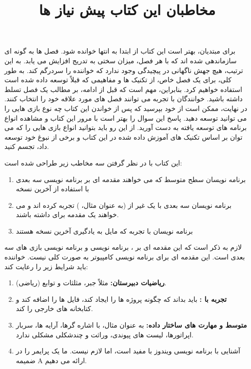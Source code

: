 {
    \Large
    برای مبتدیان، بهتر است این کتاب از ابتدا به انتها خوانده شود. فصل ها به گونه ای سازماندهی شده اند که با هر فصل، میزان سختی به تدریج افزایش می یابد. به این ترتیب، هیچ جهش ناگهانی در پیچیدگی وجود ندارد که خواننده را سردرگم کند.
    به طور کلی، برای یک فصل خاص، از تکنیک ها و مفاهیمی که قبلاً توسعه داده شده است استفاده خواهیم کرد. بنابراین، مهم است که قبل از ادامه، بر مطالب یک فصل تسلط داشته باشید.
    خوانندگان با تجربه می توانند فصل های مورد علاقه خود را انتخاب کنند. در نهایت، ممکن است از خود بپرسید که پس از خواندن این کتاب چه نوع بازی هایی را می توانید توسعه دهید. پاسخ این سوال را بهتر است با مرور این کتاب و مشاهده انواع برنامه های توسعه یافته به دست آورید. از این رو باید بتوانید انواع بازی هایی را که می توان بر اساس تکنیک های آموزش داده شده در این کتاب و برخی از نبوغ خود توسعه داد، تجسم کنید.
}

\newpage

\title{
    \LARGE
    \textbf{مخاطبان این کتاب}
}\rullFillWithLine[0.5em]{1pt} %
\textbf{\vspace{12pt}}

{
    \Large
    این کتاب با در نظر گرفتن سه مخاطب زیر طراحی شده است:
    \begin{enumerate}
        \item {برنامه نویسان سطح متوسط  که می خواهند مقدمه ای بر برنامه نویسی سه بعدی با استفاده از آخرین نسخه }
        \item {برنامه نویسان سه بعدی با یک  غیر از  (به عنوان مثال، ) تجربه کرده اند و می خواهند یک مقدمه برای  داشته باشند.}
        \item {برنامه نویسان با تجربه  که مایل به یادگیری آخرین نسخه  هستند}
    \end{enumerate}
}
\textbf{\vspace{25pt}}

\title{
    \LARGE
    \textbf{پیش نیاز ها}
} \rullFillWithLine[0.5em]{1pt}
\textbf{\vspace{12pt}}

{
    \Large
    لازم به ذکر است که این مقدمه ای بر ، برنامه نویسی  و برنامه نویسی بازی های سه بعدی است. این مقدمه ای برای برنامه نویسی کامپیوتر به صورت کلی نیست. خواننده باید شرایط زیر را رعایت کند:
    \begin{enumerate}
        \item {\textbf{ریاضیات دبیرستان: } مثلاً جبر، مثلثات و توابع (ریاضی).}
        \item {\textbf{تجربه با :} باید بداند که چگونه پروژه ها را ایجاد کند، فایل ها را اضافه کند و کتابخانه های خارجی را  کند.}
        \item {\textbf{ متوسط و مهارت های ساختار داده:} به عنوان مثال، با اشاره گرها، آرایه ها، سربار اپراتورها، لیست های پیوندی، وراثت و چندشکلی مشکلی ندارد.}
        \item {آشنایی با برنامه نویسی ویندوز با  مفید است، اما لازم نیست. ما یک پرایمر  را در ضمیمه A ارائه می دهیم.}
    \end{enumerate}
}
\textbf{\vspace{25pt}}


